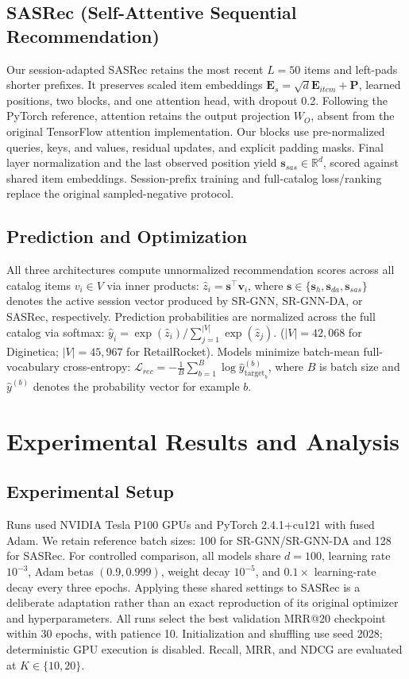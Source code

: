 \documentclass[11pt]{article}
\begin{document}
\subsection{SASRec (Self-Attentive Sequential Recommendation)}
Our session-adapted SASRec \citep{kang2018self} retains the most recent $L=50$ items and left-pads shorter prefixes. It preserves scaled item embeddings $\mathbf{E}_s=\sqrt{d}\mathbf{E}_{item}+\mathbf{P}$, learned positions, two blocks, and one attention head, with dropout 0.2. Following the PyTorch reference, attention retains the output projection $W_O$, absent from the original TensorFlow attention implementation. Our blocks use pre-normalized queries, keys, and values, residual updates, and explicit padding masks. Final layer normalization and the last observed position yield $\mathbf{s}_{sas}\in\mathbb{R}^d$, scored against shared item embeddings. Session-prefix training and full-catalog loss/ranking replace the original sampled-negative protocol.

\subsection{Prediction and Optimization}
All three architectures compute unnormalized recommendation scores across all catalog items $v_i \in V$ via inner products: $\hat{z}_i = \mathbf{s}^\top \mathbf{v}_i$, where $\mathbf{s} \in \{\mathbf{s}_h, \mathbf{s}_{da}, \mathbf{s}_{sas}\}$ denotes the active session vector produced by SR-GNN, SR-GNN-DA, or SASRec, respectively. Prediction probabilities are normalized across the full catalog via softmax: $\hat{y}_i = \exp(\hat{z}_i) / \sum_{j=1}^{|V|} \exp(\hat{z}_j)$. \quad ($|V| = 42{,}068$ for Diginetica; $|V| = 45{,}967$ for RetailRocket). Models minimize batch-mean full-vocabulary cross-entropy: $\mathcal{L}_{rec} = -\frac{1}{B}\sum_{b=1}^{B}\log \hat{y}^{(b)}_{\mathrm{target}_b}$, where $B$ is batch size and $\hat{y}^{(b)}$ denotes the probability vector for example $b$.

\section{Experimental Results and Analysis}\label{sec:results}

\subsection{Experimental Setup}
Runs used NVIDIA Tesla P100 GPUs and PyTorch 2.4.1+cu121 with fused Adam. We retain reference batch sizes: 100 for SR-GNN/SR-GNN-DA and 128 for SASRec. For controlled comparison, all models share $d=100$, learning rate $10^{-3}$, Adam betas $(0.9,0.999)$, weight decay $10^{-5}$, and $0.1\times$ learning-rate decay every three epochs. Applying these shared settings to SASRec is a deliberate adaptation rather than an exact reproduction of its original optimizer and hyperparameters. All runs select the best validation MRR@20 checkpoint within 30 epochs, with patience 10. Initialization and shuffling use seed 2028; deterministic GPU execution is disabled. Recall, MRR, and NDCG are evaluated at $K\in\{10,20\}$.
\end{document}
